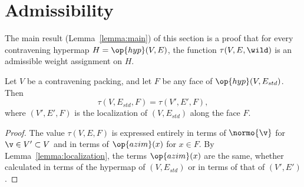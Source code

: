 \section{Admissibility}




The main result (Lemma~\ref{lemma:main}) of this section is a proof
that for every contravening hypermap $H=\op{hyp}(V,E)$, the function
$\tau(V,E,\wild)$ is an admissible weight assignment on $H$.



\begin{lemma}[]\cutrate{}  \label{lemma:tau-local}
  Let $V$ be a contravening packing, and
  let $F$ be any face of $\op{hyp}(V,E_{std})$.  Then
\[ 
\tau(V,E_{std},F) = \tau(V',E',F),
\] 
where $(V',E',F)$ is the localization of $(V,E_{std})$ along the face $F$.
\end{lemma}

\begin{proof} The value $\tau(V,E,F)$ is expressed entirely in terms
  of $\normo{\v}$ for $\v\in V'\subset V$ and in terms of
  $\op{azim}(x)$ for $x\in F$.  By Lemma~\ref{lemma:localization},
  the terms $\op{azim}(x)$ are the same, whether calculated in terms
  of the hypermap of $(V,E_{std})$ or in terms of that of $(V',E')$.
\end{proof}










%






